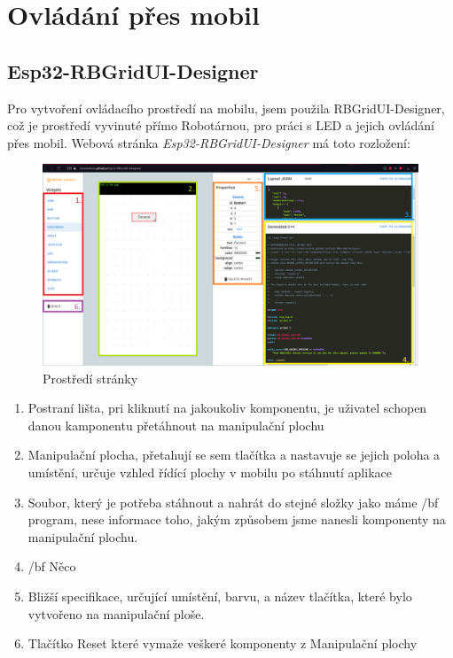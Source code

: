 \chapter{Ovládání přes mobil}


\section{Esp32-RBGridUI-Designer} %
Pro vytvoření ovládacího prostředí na mobilu, jsem použila {RBGridUI-Designer}, \cite{robotárna} což je prostředí vyvinuté přímo Robotárnou,\cite{robotárna} pro práci s LED a jejich ovládání přes mobil. Webová stránka {\em Esp32-RBGridUI-Designer} má toto rozložení: 
\begin{figure}[htbp]
	\centering
	\includegraphics[width=1\textwidth]{img/Esp32-RBGridUI-Designer.png}
	\caption{Prostředí stránky}
\end{figure}

\begin{enumerate}
	\item Postraní lišta, pri kliknutí na jakoukoliv komponentu, je uživatel schopen danou kamponentu přetáhnout na manipulační plochu
	\item Manipulační plocha, přetahují se sem tlačítka a nastavuje se jejich poloha a umístění, určuje vzhled řídící plochy v mobilu po stáhnutí aplikace
	\item Soubor, který je potřeba stáhnout a nahrát do stejné složky jako máme {/bf program}, nese informace toho, jakým způsobem jsme nanesli komponenty na manipulační plochu.
	\item /bf Něco %
	\item Bližší specifikace, určující umístění, barvu, a název tlačítka, které bylo vytvořeno na manipulační ploše. 
	\item Tlačítko Reset které vymaže veškeré komponenty z Manipulační plochy
\end{enumerate}


